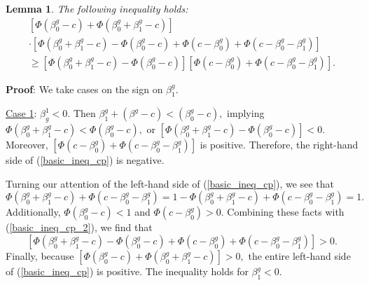 \documentclass[12pt]{article}
\newtheorem{lemma}{Lemma}
\begin{document}
\begin{lemma}
The following inequality holds: 
\begin{multline}\label{basic_ineq_cp}
\left[\Phi(\beta^g_0 - c) + \Phi(\beta^g_0 + \beta^g_1 - c) \right] \\ \cdot \left[\Phi(\beta_0^g + \beta_1^g - c) - \Phi(\beta_0^g - c) + \Phi(c - \beta^g_0) + \Phi(c - \beta_0^g - \beta_1^g) \right] \\ \geq \left[\Phi(\beta_0^g + \beta_1^g - c) - \Phi(\beta_0^g - c)\right]\left[\Phi(c - \beta^g_0) + \Phi(c - \beta_0^g - \beta_1^g)\right].
\end{multline}
\end{lemma}
\textbf{Proof}: We take cases on the sign on $\beta^g_1$.

\noindent
\underline{Case 1}: $\beta^1_g < 0$. Then $ \beta^g_1 + (\beta^g - c) < (\beta^g_0 - c),$ implying $\Phi(\beta^g_0 + \beta^g_1 - c) < \Phi(\beta^g_0 - c),$ or $[\Phi(\beta^g_0 + \beta^g_1 - c) - \Phi(\beta^g_0 - c)] < 0.$ Moreover, $[\Phi(c - \beta^g_0) + \Phi(c - \beta_0^g - \beta_1^g)]$ is positive. Therefore, the right-hand side of (\ref{basic_ineq_cp}) is negative.

Turning our attention of the left-hand side of (\ref{basic_ineq_cp}), we see that
\begin{equation}\label{basic_ineq_cp_2}
\Phi(\beta^g_0 + \beta^g_1 - c) + \Phi( c - \beta^g_0 - \beta^g_1) = 1 -\Phi(\beta^g_0 + \beta^g_1 - c) + \Phi( c - \beta^g_0 - \beta^g_1) = 1.
\end{equation}
Additionally, $\Phi(\beta^g_0 - c) < 1$ and $ \Phi(c - \beta^g_0) > 0$. Combining these facts with (\ref{basic_ineq_cp_2}), we find that
$$ \left[\Phi(\beta_0^g + \beta_1^g - c) - \Phi(\beta_0^g - c) + \Phi(c - \beta^g_0) + \Phi(c - \beta_0^g - \beta_1^g) \right] > 0. $$ Finally, because $\left[\Phi(\beta^g_0 - c) + \Phi(\beta^g_0 + \beta^g_1 - c) \right] > 0,$ the entire left-hand side of (\ref{basic_ineq_cp}) is positive. The inequality holds for $\beta^g_1 < 0$.
\end{document}
